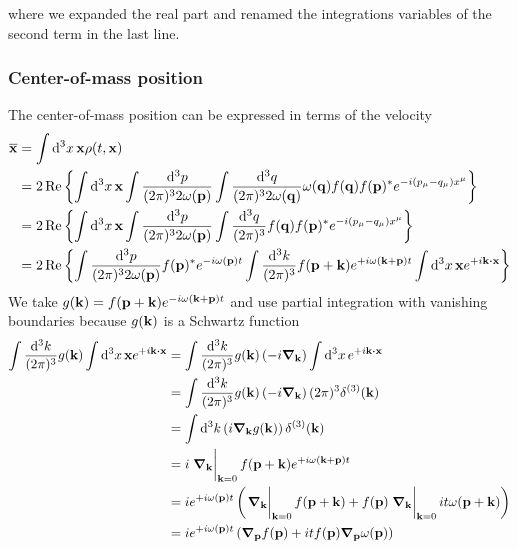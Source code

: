 where we expanded the real part and renamed the integrations variables of the second term in the last line.

\subsubsection{Center-of-mass position}

The center-of-mass position can be expressed in terms of the velocity
\begin{equation}
	\begin{split}
		\overline{\vb{x}}
		&=
		\int\dd[3]{x}
		\vb{x}
		\rho(t,\vb{x})
		\\
		&=
		2\Re\left\{
			\int\dd[3]{x}
			\vb{x}
			\int\frac{\dd[3]{p}}{(2\pi)^32\omega(\vb{p})}
			\int\frac{\dd[3]{q}}{(2\pi)^32\omega(\vb{q})}
			\omega(\vb{q})
			f(\vb{q})
			f(\vb{p})^*
			e^{-i(p_\mu-q_\mu)x^\mu}
		\right\}
		\\
		&=
		2\Re\left\{
			\int\dd[3]{x}
			\vb{x}
			\int\frac{\dd[3]{p}}{(2\pi)^32\omega(\vb{p})}
			\int\frac{\dd[3]{q}}{(2\pi)^3}
			f(\vb{q})
			f(\vb{p})^*
			e^{-i(p_\mu-q_\mu)x^\mu}
		\right\}
		\\
		&=
		2\Re\left\{
			\int\frac{\dd[3]{p}}{(2\pi)^32\omega(\vb{p})}
			f(\vb{p})^*
			e^{-i\omega(\vb{p})t}
			\int\frac{\dd[3]{k}}{(2\pi)^3}
			f(\vb{p}+\vb{k})
			e^{+i\omega(\vb{k}+\vb{p})t}
			\int\dd[3]{x}
			\vb{x}
			e^{+i\vb{k}\vdot\vb{x}}
		\right\}
	\end{split}
\end{equation}
We take $g(\vb{k})=f(\vb{p}+\vb{k})e^{-i\omega(\vb{k}+\vb{p})t}$ and use partial integration with vanishing boundaries because $g(\vb{k})$ is a Schwartz function
\begin{equation}
	\begin{split}
		\int\frac{\dd[3]{k}}{(2\pi)^3}
		g(\vb{k})
		\int\dd[3]{x}
		\vb{x}
		e^{+i\vb{k}\vdot\vb{x}}
		&=
		\int\frac{\dd[3]{k}}{(2\pi)^3}
		g(\vb{k})
		\left(-i\grad_{\vb{k}}\right)
		\int\dd[3]{x}
		e^{+i\vb{k}\vdot\vb{x}}
		\\
		&=
		\int\frac{\dd[3]{k}}{(2\pi)^3}
		g(\vb{k})
		\left(-i\grad_{\vb{k}}\right)
		(2\pi)^3\delta^{(3)}(\vb{k})
		\\
		&=
		\int\dd[3]{k}
		\left(i\grad_{\vb{k}}g(\vb{k})\right)
		\delta^{(3)}(\vb{k})
		\\
		&=
		i\eval{\grad_{\vb{k}}}_{\vb{k}=0}
		f(\vb{p}+\vb{k})
		e^{+i\omega(\vb{k}+\vb{p})t}
		\\
		&=
		ie^{+i\omega(\vb{p})t}
		\left(
			\eval{\grad_{\vb{k}}}_{\vb{k}=0}
			f(\vb{p}+\vb{k})
			+
			f(\vb{p})
			\eval{\grad_{\vb{k}}}_{\vb{k}=0}
			it\omega(\vb{p}+\vb{k})
		\right)
		\\
		&=
		ie^{+i\omega(\vb{p})t}
		\left(
			\grad_{\vb{p}}
			f(\vb{p})
			+
			it
			f(\vb{p})
			\grad_{\vb{p}}
			\omega(\vb{p})
		\right)
	\end{split}
\end{equation}
